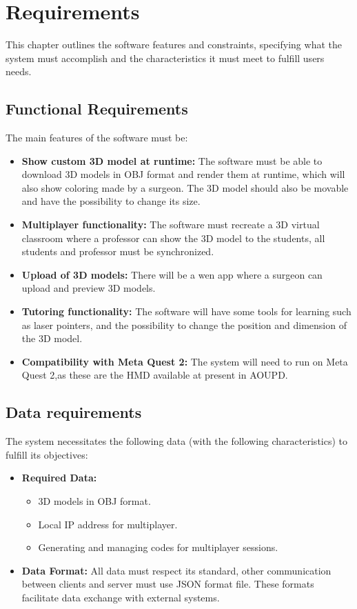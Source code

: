 
\chapter{Requirements}
\label{chp:Requirements}
\noindent
This chapter outlines the software features and constraints, specifying what the system must accomplish and the characteristics it must meet to fulfill users needs.

\section{Functional Requirements}
\noindent
The main features of the software must be:

\begin{itemize}
  \item \textbf{Show custom 3D model at runtime:} The software must be able to download 3D models in OBJ format and render them at runtime, which will also show coloring made by a surgeon. The 3D model should also be movable and have the possibility to change its size. 
  \item \textbf{Multiplayer functionality:} The software must recreate a 3D virtual classroom where a professor can show the 3D model to the students, all students and professor must be synchronized.
  \item \textbf{Upload of 3D models:} There will be a wen app where a surgeon can upload and preview 3D models.
  \item \textbf{Tutoring functionality:} The software will have some tools for learning such as laser pointers, and the possibility to change the position and dimension of the 3D model.
  \item \textbf{Compatibility with Meta Quest 2:} The system will need to run on Meta Quest 2,as these are the HMD available at present in \ac{AOUPD}.
\end{itemize}
\section{Data requirements}
\noindent
The system necessitates the following data (with the following characteristics) to fulfill its objectives:

\begin{itemize}
  \item \textbf{Required Data:} 
  \begin{itemize}
    \item 3D models in OBJ format.
    \item Local \ac{IP} address for multiplayer.
    \item Generating and managing codes for multiplayer sessions.
  \end{itemize}
  \item \textbf{Data Format:} All data must respect its standard, other communication between clients and server must use \ac{JSON} format file. These formats facilitate data exchange with external systems.
\end{itemize}

